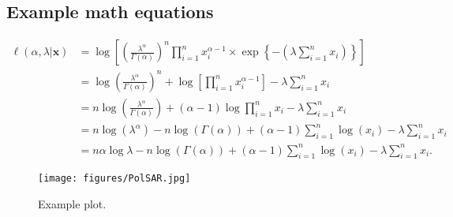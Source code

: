 \subsection*{Example math equations}
\begin{align}
\label{eq:em}
\ell(\alpha, \lambda| \bm{x}) &=\log\left[\left(\frac{\lambda^{\alpha}}{\Gamma(\alpha)}\right)^n\prod_{i=1}^nx_i^{\alpha-1}\times \exp\left\{-\left(\lambda\sum_{i=1}^n x_i \right)\right\}\right]\nonumber\\
&=\log\left(\frac{\lambda^{\alpha}}{\Gamma(\alpha)}\right)^n+\log\left[\prod_{i=1}^nx_i^{\alpha-1}\right]-\lambda\sum_{i=1}^nx_i\nonumber\\
&=n\log\left(\frac{\lambda^{\alpha}}{\Gamma(\alpha)}\right)+(\alpha-1)\log\prod_{i=1}^nx_i-\lambda\sum_{i=1}^nx_i\nonumber\\
&=n\log(\lambda^{\alpha})-n\log(\Gamma(\alpha))+(\alpha-1)\sum_{i=1}^n\log(x_i)-\lambda\sum_{i=1}^nx_i\nonumber\\
&=n\alpha\log \lambda -n\log(\Gamma(\alpha)) +(\alpha-1)\sum_{i=1}^n\log(x_i)-\lambda\sum_{i=1}^nx_i.
	\end{align}
\begin{figure}
    \centering
    \texttt{[image: figures/PolSAR.jpg]}
    \decoRule
    \caption[Example plot]{Example plot.}
    \label{fig:undercatch}
\end{figure}


